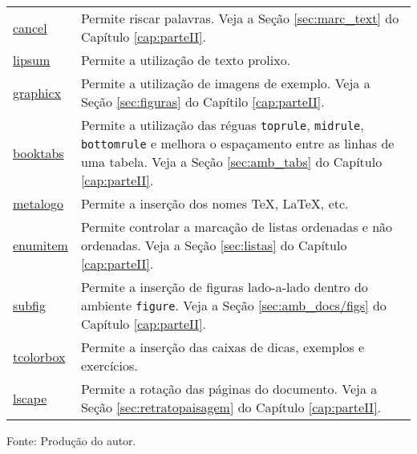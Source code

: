 \begin{longtable}{@{\extracolsep{\fill}}p{2cm} p{12cm}}
\href{https://www.ctan.org/pkg/cancel}{cancel} & Permite riscar palavras. Veja a Seção \ref{sec:marc_text} do Capítulo \ref{cap:parteII}. \\
\href{https://www.ctan.org/pkg/lipsum}{lipsum} & Permite a utilização de texto prolixo. \\
\href{https://www.ctan.org/pkg/graphicx}{graphicx} & Permite a utilização de imagens de exemplo. Veja a Seção \ref{sec:figuras} do Capítilo \ref{cap:parteII}. \\
\href{https://www.ctan.org/pkg/booktabs}{booktabs} & Permite a utilização das réguas {\tt toprule}, {\tt midrule}, {\tt bottomrule} e melhora o espaçamento entre as linhas de uma tabela. Veja a Seção \ref{sec:amb_tabs} do Capítulo \ref{cap:parteII}. \\
\href{https://www.ctan.org/pkg/metalogo}{metalogo} & Permite a inserção dos nomes \TeX{}, \LaTeX{}, \XeLaTeX{} etc. \\
\href{https://www.ctan.org/pkg/enumitem}{enumitem} & Permite controlar a marcação de listas ordenadas e não ordenadas. Veja a Seção \ref{sec:listas} do Capítulo \ref{cap:parteII}. \\
\href{https://www.ctan.org/pkg/subfig}{subfig}  & Permite a inserção de figuras lado-a-lado dentro do ambiente {\tt figure}. Veja a Seção \ref{sec:amb_docs/figs} do Capítulo \ref{cap:parteII}. \\
\href{https://www.ctan.org/pkg/tcolorbox}{tcolorbox} & Permite a inserção das caixas de dicas, exemplos e exercícios. \\
\href{https://www.ctan.org/pkg/lscape}{lscape} & Permite a rotação das páginas do documento. Veja a Seção \ref{sec:retratopaisagem} do Capítulo \ref{cap:parteII}. \\
\end{longtable}
\vspace{-8mm}
\begin{center}
	Fonte: Produção do autor.
\end{center}
